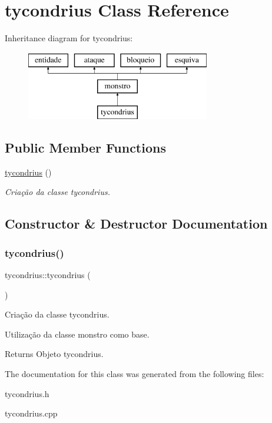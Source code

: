 \hypertarget{classtycondrius}{}\section{tycondrius Class Reference}
\label{classtycondrius}
Inheritance diagram for tycondrius\+:\begin{figure}[H]
\begin{center}
\leavevmode
\includegraphics[height=3.000000cm]{classtycondrius}
\end{center}
\end{figure}
\subsection*{Public Member Functions}
\begin{DoxyCompactItemize}
\item 
\mbox{\hyperlink{classtycondrius_abc367b8da7d7d6d0709be8e76b911bf2}{tycondrius}} ()
\begin{DoxyCompactList}\small\item\em Criação da classe tycondrius. \end{DoxyCompactList}\end{DoxyCompactItemize}


\subsection{Constructor \& Destructor Documentation}
\mbox{\label{classtycondrius_abc367b8da7d7d6d0709be8e76b911bf2}} 
\subsubsection{\texorpdfstring{tycondrius()}{tycondrius()}}
{\footnotesize\ttfamily tycondrius\+::tycondrius (\begin{DoxyParamCaption}{ }\end{DoxyParamCaption})}



Criação da classe tycondrius. 

Utilização da classe monstro como base. \begin{DoxyReturn}{Returns}
Objeto tycondrius. 
\end{DoxyReturn}


The documentation for this class was generated from the following files\+:\begin{DoxyCompactItemize}
\item 
tycondrius.\+h\item 
tycondrius.\+cpp\end{DoxyCompactItemize}
